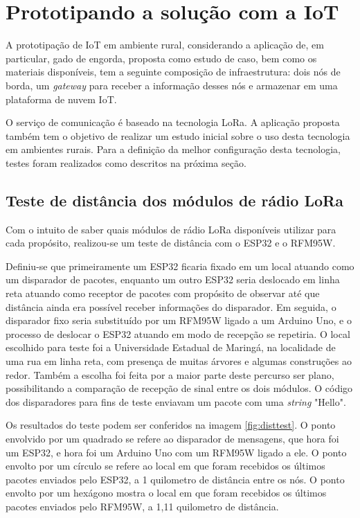 \documentclass[
    hidelinks,
	12pt,				%
	openany,
	oneside, 
	a4paper,			%
	english,			%
	french,				%
	spanish,			%
	brazil				%
	]{abntex2}
\begin{document}
\section{Prototipando a solução com a IoT}

A prototipação de IoT em ambiente rural, considerando a aplicação de, em particular, gado de engorda, proposta como estudo de caso, bem como os materiais disponíveis, tem a seguinte composição de infraestrutura: dois nós de borda, um \textit{gateway} para receber a informação desses nós e armazenar em uma plataforma de nuvem IoT. 

O serviço de comunicação é baseado na tecnologia LoRa. A aplicação proposta também tem o objetivo de realizar um estudo inicial sobre o uso desta tecnologia em ambientes rurais. Para a definição da melhor configuração desta tecnologia, testes foram realizados como descritos na próxima seção.

\subsection{Teste de distância dos módulos de rádio LoRa}
Com o intuito de saber quais módulos de rádio LoRa disponíveis utilizar para cada propósito, realizou-se um teste de distância com o ESP32 e o RFM95W.  

Definiu-se que primeiramente um ESP32 ficaria fixado em um local atuando como um disparador de pacotes, enquanto um outro ESP32 seria deslocado em linha reta atuando como receptor de pacotes com propósito de observar até que distância ainda era possível receber informações do disparador. Em seguida, o disparador fixo seria substituído por um RFM95W ligado a um Arduino Uno, e o processo de deslocar o ESP32 atuando em modo de recepção se repetiria. O local escolhido para teste foi a Universidade Estadual de Maringá, na localidade de uma rua em linha reta, com presença de muitas árvores e algumas construções ao redor. Também a escolha foi feita por a maior parte deste percurso ser plano, possibilitando a comparação de recepção de sinal entre os dois módulos. O código dos disparadores para fins de teste enviavam um pacote com uma \textit{string} "Hello". 

Os resultados do teste podem ser conferidos na imagem \ref{fig:disttest}. O ponto envolvido por um quadrado se refere ao disparador de mensagens, que hora foi um ESP32, e hora foi um Arduino Uno com um RFM95W ligado a ele. O ponto envolto por um círculo se refere ao local em que foram recebidos os últimos pacotes enviados pelo ESP32, a 1 quilometro de distância entre os nós. O ponto envolto por um hexágono mostra o local em que foram recebidos os últimos pacotes enviados pelo RFM95W, a 1,11 quilometro de distância.
\end{document}
